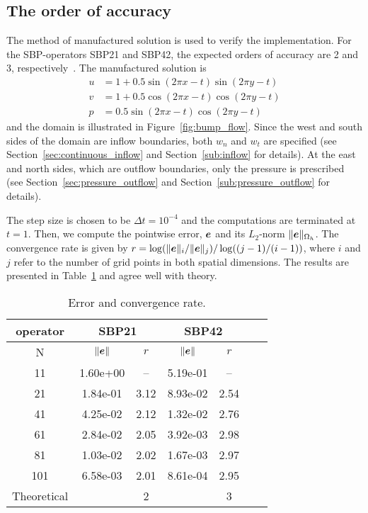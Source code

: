 \subsection{The order of accuracy}
The method of manufactured solution is used to verify the implementation. For the SBP-operators SBP21 and SBP42, the expected orders of accuracy are 2 and 3, respectively~\cite{svard2014review}. The manufactured solution is 
\begin{equation*}
  \begin{aligned}
    u & = 1 + 0.5 \sin(2\pi x-t)\sin(2\pi y-t)
    \\
    v & = 1 + 0.5 \cos(2\pi x-t)\cos(2\pi y-t)
    \\
    p & = 0.5 \sin(2\pi x-t)\cos(2\pi y-t)
 \end{aligned}
\end{equation*}
and the domain is illustrated in Figure~\ref{fig:bump_flow}. Since the west and south sides of the domain are inflow boundaries, both $w_n$ and $w_t$ are specified (see Section~\ref{sec:continuous_inflow} and Section~\ref{sub:inflow} for details). At the east and north sides, which are outflow boundaries, only the pressure is prescribed (see Section~\ref{sec:pressure_outflow} and Section~\ref{sub:pressure_outflow} for details).

The step size is chosen to be $\Delta t = 10^{-4}$ and the computations are terminated at $t = 1$. Then, we compute the pointwise error, $\bm{e}$ and its $L_2$-norm $\|\bm{e}\|_{\Omega_h}$. The convergence rate is given by $r = \log(\|\bm{e}\|_{i}/\|\bm{e}\|_{j})/\log((j-1)/(i-1))$, where $i$ and $j$ refer to the number of grid points in both spatial dimensions. The results are presented in Table~\ref{tab:convergence_table} and agree well with theory.
\begin{table}
\centering
\setlength{\tabcolsep}{12pt}
\begin{tabular}{c| cc | cc cc}
 \hline
 \hline
 operator
 & \multicolumn{2}{c|}{SBP21}
 & \multicolumn{2}{c}{SBP42}
 \\
\hline
 \hline
N & $\|\bm{e}\|$ & $r$ &$\|\bm{e}\|$ & $r$
\\
\hline
11 & 1.60e+00 & --   & 5.19e-01 & --
\\                   
21 & 1.84e-01 & 3.12 & 8.93e-02 & 2.54 
\\                   
41 & 4.25e-02 & 2.12 & 1.32e-02& 2.76
\\                   
61 & 2.84e-02 & 2.05 & 3.92e-03& 2.98  
\\
81& 1.03e-02 & 2.02  & 1.67e-03 & 2.97  
\\
101& 6.58e-03 & 2.01 & 8.61e-04 & 2.95 
\\
\hline
Theoretical && 2 && 3
\end{tabular}
\caption{Error and convergence rate.}%
\label{tab:convergence_table}
\end{table}

\FloatBarrier%

